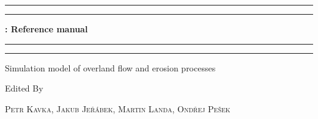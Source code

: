 

\begin{titlepage} %

	
	\scshape %
	
	\vspace*{\baselineskip} %
	
	
    \begin{center}
	\rule{\textwidth}{0pt}\vspace*{-\baselineskip}\vspace*{2pt} %
	\rule{\textwidth}{0.4pt} %
	
	\vspace{0.75\baselineskip} %
	
	{\LARGE \bf \smod: Reference manual} %
	
	
	\rule{\textwidth}{0.4pt}\vspace*{-\baselineskip}\vspace{3.2pt} %
	\rule{\textwidth}{0pt} %
	
	\vspace{2\baselineskip} %
    \end{center}
	
	
	Simulation model of overland flow and erosion processes
	
	\vspace*{3\baselineskip} %
	
	
	Edited By
	
	\vspace{0.5\baselineskip} %
	
    {\scshape\Large Petr Kavka, Jakub Jeřábek, Martin Landa, Ondřej Pešek}
	

\end{titlepage}

